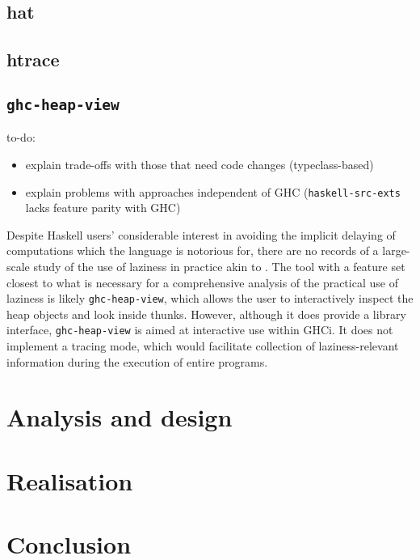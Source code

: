 \documentclass[thesis=B,english]{FITthesis}[2019/12/23]
\begin{document}
\section{hat}
\section{htrace}
\section{\texttt{ghc-heap-view}}

to-do:
\begin{itemize}
	\item explain trade-offs with those that need code changes (typeclass-based)
	\item explain problems with approaches independent of GHC
		(\texttt{haskell-src-exts} lacks feature parity with GHC)
\end{itemize}

Despite Haskell users' considerable interest in avoiding the implicit delaying
of computations which the language is notorious for, there are no records of a
large-scale study of the use of laziness in practice akin to
\cite{emp-study-laziness-r}. The tool with a feature set closest to what is
necessary for a comprehensive analysis of the practical use of laziness is
likely \texttt{ghc-heap-view}, which allows the user to interactively inspect
the heap objects and look inside thunks. However, although it does provide a
library interface, \texttt{ghc-heap-view} is aimed at interactive use within
GHCi. It does not implement a tracing mode, which would facilitate collection
of laziness-relevant information during the execution of entire programs.

\chapter{Analysis and design}

\chapter{Realisation}

\chapter{Conclusion}




\end{document}
